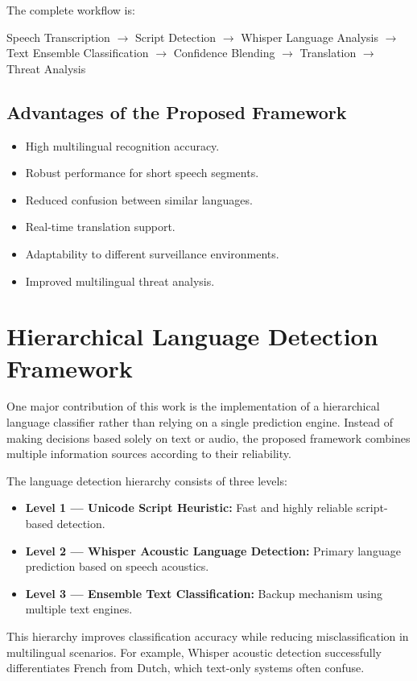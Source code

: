 \documentclass[12pt]{report}
\begin{document}
The complete workflow is:
\begin{center}
Speech Transcription $\rightarrow$ Script Detection $\rightarrow$ Whisper Language Analysis $\rightarrow$ Text Ensemble Classification $\rightarrow$ Confidence Blending $\rightarrow$ Translation $\rightarrow$ Threat Analysis
\end{center}

\subsection{Advantages of the Proposed Framework}
\begin{itemize}
    \item High multilingual recognition accuracy.
    \item Robust performance for short speech segments.
    \item Reduced confusion between similar languages.
    \item Real-time translation support.
    \item Adaptability to different surveillance environments.
    \item Improved multilingual threat analysis.
\end{itemize}

\section{Hierarchical Language Detection Framework}

One major contribution of this work is the implementation of a hierarchical language classifier rather than relying on a single prediction engine. Instead of making decisions based solely on text or audio, the proposed framework combines multiple information sources according to their reliability.

The language detection hierarchy consists of three levels:
\begin{itemize}
    \item \textbf{Level 1 --- Unicode Script Heuristic:} Fast and highly reliable script-based detection.
    \item \textbf{Level 2 --- Whisper Acoustic Language Detection:} Primary language prediction based on speech acoustics.
    \item \textbf{Level 3 --- Ensemble Text Classification:} Backup mechanism using multiple text engines.
\end{itemize}

This hierarchy improves classification accuracy while reducing misclassification in multilingual scenarios. For example, Whisper acoustic detection successfully differentiates French from Dutch, which text-only systems often confuse.
\end{document}
